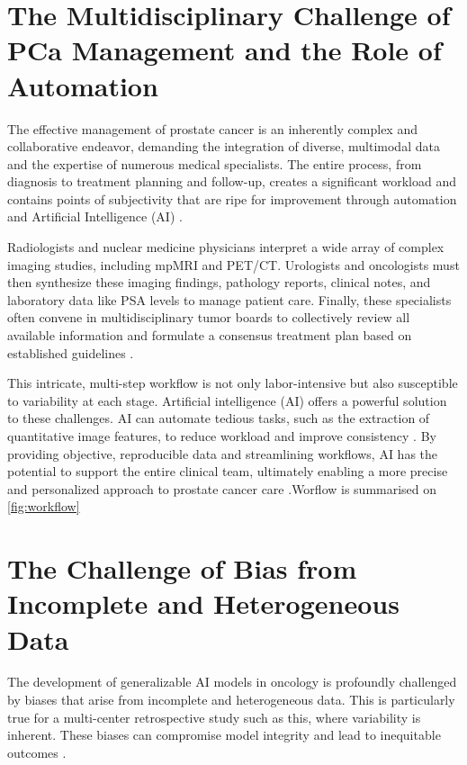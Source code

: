 \documentclass[11pt, a4paper]{article}
\begin{document}
\section{The Multidisciplinary Challenge of PCa Management and the Role of Automation}
The effective management of prostate cancer is an inherently complex and collaborative endeavor, demanding the integration of diverse, multimodal data and the expertise of numerous medical specialists. The entire process, from diagnosis to treatment planning and follow-up, creates a significant workload and contains points of subjectivity that are ripe for improvement through automation and Artificial Intelligence (AI) \cite{MohseniniaZamaniSiahkali2024, FerroCobelli2022}.

Radiologists and nuclear medicine physicians interpret a wide array of complex imaging studies, including mpMRI and PET/CT. Urologists and oncologists must then synthesize these imaging findings, pathology reports, clinical notes, and laboratory data like PSA levels to manage patient care. Finally, these specialists often convene in multidisciplinary tumor boards to collectively review all available information and formulate a consensus treatment plan based on established guidelines \cite{MohseniniaZamaniSiahkali2024, UnknownAuthor2017}.

This intricate, multi-step workflow is not only labor-intensive but also susceptible to variability at each stage. Artificial intelligence (AI) offers a powerful solution to these challenges. AI can automate tedious tasks, such as the extraction of quantitative image features, to reduce workload and improve consistency \cite{MohseniniaZamaniSiahkali2024, ChaddadTan2023}. By providing objective, reproducible data and streamlining workflows, AI has the potential to support the entire clinical team, ultimately enabling a more precise and personalized approach to prostate cancer care \cite{LaroseArchambault2024, BhattacharyaKhandwala2022}.Worflow is summarised on \ref{fig:workflow}


\section{The Challenge of Bias from Incomplete and Heterogeneous Data}
The development of generalizable AI models in oncology is profoundly challenged by biases that arise from incomplete and heterogeneous data. This is particularly true for a multi-center retrospective study such as this, where variability is inherent. These biases can compromise model integrity and lead to inequitable outcomes \cite{VenugopalGupta2023, CorreaShaan2022}.
\end{document}
